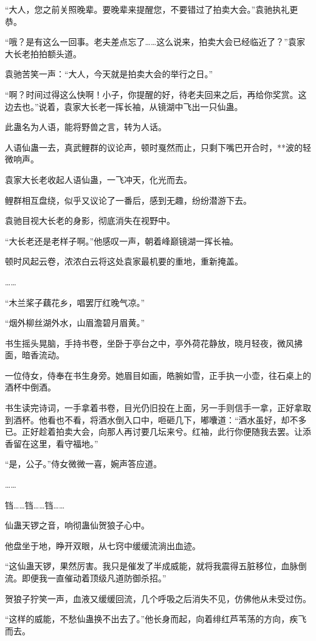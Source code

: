 \begin{this_body}
“大人，您之前关照晚辈。要晚辈来提醒您，不要错过了拍卖大会。”袁驰执礼更恭。

“哦？是有这么一回事。老夫差点忘了……这么说来，拍卖大会已经临近了？”袁家大长老拍拍额头道。

袁驰苦笑一声：“大人，今天就是拍卖大会的举行之日。”

“啊？时间过得这么快啊！小子，你提醒的好，待老夫回来之后，再给你奖赏。这边去也。”说着，袁家大长老一挥长袖，从镜湖中飞出一只仙蛊。

此蛊名为人语，能将野兽之言，转为人话。

人语仙蛊一去，真武鲤群的议论声，顿时戛然而止，只剩下嘴巴开合时，**波的轻微响声。

袁家大长老收起人语仙蛊，一飞冲天，化光而去。

鲤群相互盘绕，似乎又议论了一番后，感到无趣，纷纷潜游下去。

袁驰目视大长老的身影，彻底消失在视野中。

“大长老还是老样子啊。”他感叹一声，朝着峰巅镜湖一挥长袖。

顿时风起云卷，浓浓白云将这处袁家最机要的重地，重新掩盖。

……

“木兰桨子藕花乡，唱罢厅红晚气凉。”

“烟外柳丝湖外水，山眉澹碧月眉黄。”

书生摇头晃脑，手持书卷，坐卧于亭台之中，亭外荷花静放，晓月轻夜，微风拂面，暗香流动。

一位侍女，侍奉在书生身旁。她眉目如画，皓腕如雪，正手执一小壶，往石桌上的酒杯中倒酒。

书生读完诗词，一手拿着书卷，目光仍旧投在上面，另一手则信手一拿，正好拿取到酒杯。他看也不看，将酒水倒入口中，咂砸几下，嘟囔道：“酒水虽好，却不多已。正好趁着拍卖大会，向那人再讨要几坛来兮。红袖，此行你便随我去罢。让添香留在这里，看守福地。”

“是，公子。”侍女微微一喜，婉声答应道。

……

铛……铛……铛……

仙蛊天锣之音，响彻蛊仙贺狼子心中。

他盘坐于地，睁开双眼，从七窍中缓缓流淌出血迹。

“这仙蛊天锣，果然厉害。我只是催发了半成威能，就将我震得五脏移位，血脉倒流。即便我一直催动着顶级凡道防御杀招。”

贺狼子狞笑一声，血液又缓缓回流，几个呼吸之后消失不见，仿佛他从未受过伤。

“这样的威能，不愁仙蛊换不出去了。”他长身而起，向着绯红芦苇荡的方向，疾飞而去。


\end{this_body}
